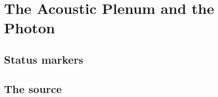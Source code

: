 
\providecommand{\BM}{\textbf{[B]}}
\providecommand{\KM}{\textbf{[K]}}
\providecommand{\SM}{\textbf{[S]}}
\providecommand{\XM}{\textbf{[X]}}
\providecommand{\QM}{\textbf{[Q]}}

\chapter*{The Acoustic Plenum and the Photon}

\begin{abstract}
C.~C.~Lien (Zenodo, DOI 10.5281/zenodo.21800087, 8~September 2026) interprets
space as a compressible superfluid, derives the electron mass from the
temperature of the cosmic microwave background, adopts a mass formula for the
muon and tau, equates the neutrino mass with $k_BT_\text{CMB}$ and describes the
photon as a longitudinal shockwave with a transverse wake. This document
examines the paper as a case study with a verification script (20/20). The
numerical values are reproducible \KM. None of the load-bearing claims
survives the check: the electron hit lies 88 standard deviations from the
measured value and is not significant in the null test, the lepton formula is
known, the neutrino mass is incompatible with oscillation data, the redshift
would be frequency-dependent, and the photon would have three instead of two
polarisations \XM. The cross-check shows how FFGFT proceeds at the same
points, without repeating those contents.
\end{abstract}

\section*{Status markers}


\section{The source}

